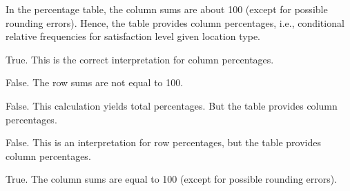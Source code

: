 \begin{solution}

In the percentage table, the column sums are about 100 (except for possible rounding errors).
Hence, the table provides column percentages, i.e., conditional relative frequencies for satisfaction level given location type.

\begin{answerlist}
  \item True. This is the correct interpretation for column percentages.
  \item False. The  row sums are not equal to 100.
  \item False. This calculation yields total percentages. But the table provides  column percentages.
  \item False. This is an interpretation for row percentages, but the table provides  column percentages.
  \item True. The column sums are equal to 100 (except for possible rounding errors).
\end{answerlist}
\end{solution}

